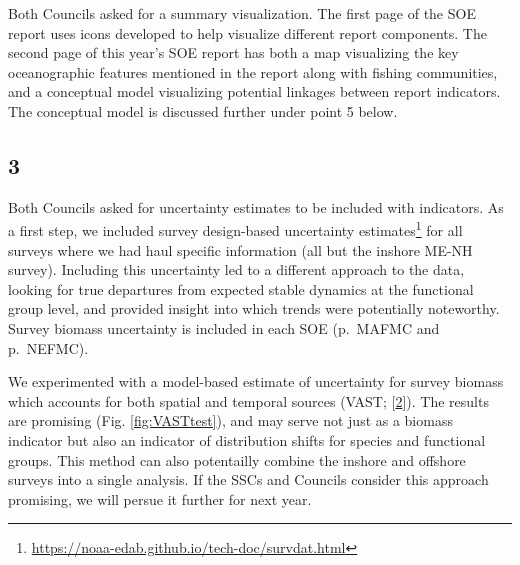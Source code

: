 \documentclass[
  10pt,
]{article}
\begin{document}
Both Councils asked for a summary visualization. The first page of the
SOE report uses icons developed to help visualize different report
components. The second page of this year's SOE report has both a map
visualizing the key oceanographic features mentioned in the report along
with fishing communities, and a conceptual model visualizing potential
linkages between report indicators. The conceptual model is discussed
further under point 5 below.

\hypertarget{section-2}{%
\subsection{3}\label{section-2}}

Both Councils asked for uncertainty estimates to be included with
indicators. As a first step, we included survey design-based uncertainty
estimates\footnote{\url{https://noaa-edab.github.io/tech-doc/survdat.html}}
for all surveys where we had haul specific information (all but the
inshore ME-NH survey). Including this uncertainty led to a different
approach to the data, looking for true departures from expected stable
dynamics at the functional group level, and provided insight into which
trends were potentially noteworthy. Survey biomass uncertainty is
included in each SOE (p.~MAFMC and p.~NEFMC).

We experimented with a model-based estimate of uncertainty for survey
biomass which accounts for both spatial and temporal sources (VAST;
{[}\protect\hyperlink{ref-thorson_guidance_2019}{2}{]}). The results are
promising (Fig. \ref{fig:VASTtest}), and may serve not just as a biomass
indicator but also an indicator of distribution shifts for species and
functional groups. This method can also potentailly combine the inshore
and offshore surveys into a single analysis. If the SSCs and Councils
consider this approach promising, we will persue it further for next
year.
\end{document}
